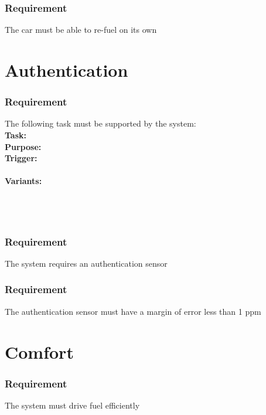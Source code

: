 \documentclass{article}
\begin{document}
{      \subsubsection{Requirement}
\hfill \break 
\- \- \-The car must be able to re-fuel on its own

\section{Authentication}
\subsubsection {Requirement}
\hfill \break 
\- \- \-The following task must be supported by the system:\\
\hfill \break 
\textbf{Task:} \\
\textbf{Purpose:} \\
\textbf{Trigger:} \\
\\
\noindent
\textbf{Variants:}     \\
\tab{ }  \\
\tab{ }  \\
\tab{ }  \\
\tab{ }   
\bigskip

    \subsubsection{Requirement}
\hfill \break 
\- \- \-The system requires an authentication sensor
    \subsubsection{Requirement}
\hfill \break 
\- \- \-The authentication sensor must have a margin of error less than 1 ppm


\section{Comfort}
    \subsubsection{Requirement}
\hfill \break 
\- \- \-The system must drive fuel efficiently
}
\end{document}

